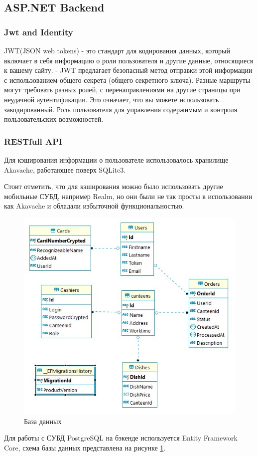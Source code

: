 \documentclass[14pt]{matmex-diploma-custom}
\begin{document}
        \subsection{ASP.NET Backend}
        \subsubsection{Jwt and Identity}
        JWT(JSON web tokens) - это стандарт для кодирования данных, который включает в себя информацию о роли пользователя и другие данные, относящиеся к вашему сайту.
        - JWT предлагает безопасный метод отправки этой информации с использованием общего секрета (общего секретного ключа).
        Разные маршруты могут требовать разных ролей, с перенаправлениями на другие страницы при неудачной аутентификации.
        Это означает, что вы можете использовать закодированный.
        Роль пользователя для управления содержимым и контроля пользовательских возможностей.
        
        \subsubsection{RESTfull API}
        Для кэширования информации о пользователе использовалось хранилище Akavache\cite{akavache_github}, работающее поверх SQLite3.
        
        Стоит отметить, что для кэширования можно было использовать другие мобильные СУБД,
        например Realm, но они были не так просты в использовании как Akavache и обладали избыточной функциональностью.
        
        \begin{figure}
        \centering
        \includegraphics[scale=0.8]{database_arch1.jpg}
        \caption{База данных}
        \label{db_arch}
        \end{figure}
        Для работы с СУБД PostgreSQL на бэкенде используется Entity Framework Core,
        схема базы данных представлена на рисунке \ref{db_arch}.
        
\end{document}
